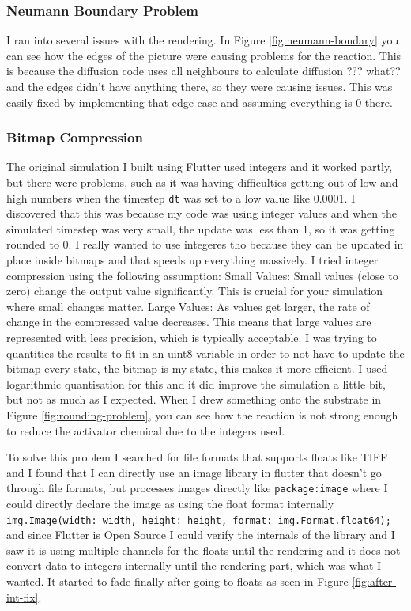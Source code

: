 \subsubsection{Neumann Boundary Problem}
I ran into several issues with the rendering. In Figure \ref{fig:neumann-bondary} you can see how the edges of the picture were causing problems for the reaction. This is because the diffusion code uses all neighbours to calculate diffusion ??? what?? and the edges didn't have anything there, so they were causing issues. This was easily fixed by implementing that edge case and assuming everything is 0 there. 

\subsubsection{Bitmap Compression}
The original simulation I built using Flutter used integers and it worked partly, but there were problems, such as it was having difficulties getting out of low and high numbers when the timestep \verb|dt| was set to a low value like 0.0001. I discovered that this was because my code was using integer values and when the simulated timestep was very small, the update was less than 1, so it was getting rounded to 0. 
I really wanted to use integeres tho because they can be updated in place inside bitmaps and that speeds up everything massively. I tried integer compression using the following assumption:
Small Values: Small values (close to zero) change the output value significantly. This is crucial for your simulation where small changes matter.
Large Values: As values get larger, the rate of change in the compressed value decreases. This means that large values are represented with less precision, which is typically acceptable.
I was trying to quantities the results to fit in an uint8 variable in order to not have to update the bitmap every state, the bitmap is my state, this makes it more efficient. 
I used logarithmic quantisation for this and it did improve the simulation a little bit, but not as much as I expected. 
When I drew something onto the substrate in Figure \ref{fig:rounding-problem}, you can see how the reaction is not strong enough to reduce the activator chemical due to the integers used. 

To solve this problem I searched for file formats that supports floats like TIFF and I found that I can directly use an image library in flutter that doesn't go through file formats, but processes images directly like \verb|package:image| where I could directly declare the image as using the float format internally \verb|img.Image(width: width, height: height, format: img.Format.float64);| and since Flutter is Open Source I could verify the internals of the library and I saw it is using multiple channels for the floats until the rendering and it does not convert data to integers internally until the rendering part, which was what I wanted. It started to fade finally after going to floats as seen in Figure \ref{fig:after-int-fix}.

